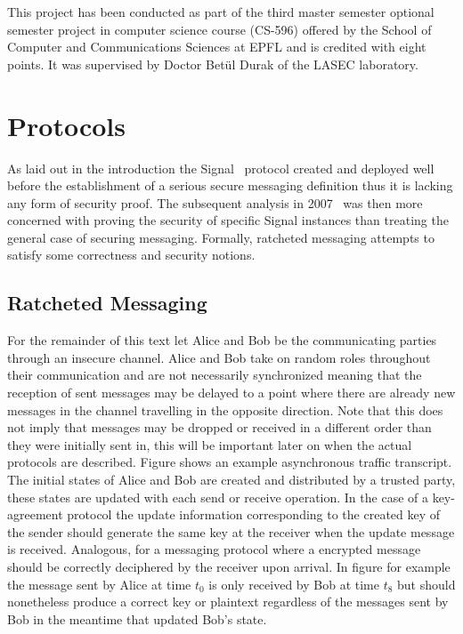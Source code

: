 \documentclass[11pt,a4paper,twoside,openright,bibliography=totoc]{scrbook}
\begin{document}
This project has been conducted as part of the third master semester optional
semester project in computer science course (CS-596) offered by the
School of Computer and Communications Sciences at EPFL and is credited
with eight points. It was supervised by Doctor Betül Durak of
the LASEC laboratory.

\chapter{Protocols}
\label{chap:protocols}

As laid out in the introduction the Signal~\cite{perrin2016double}
protocol created and deployed well before the establishment of a
serious secure messaging definition thus it is lacking any form of
security proof. The subsequent analysis in 2007~\cite{cohn2017formal}
was then more concerned with proving the security of specific Signal
instances than treating the general case of securing
messaging. Formally, ratcheted messaging attempts to satisfy some
correctness and security notions.


\section{Ratcheted Messaging}
\label{sec:ratcheted-messaging}

For the remainder of this text let Alice and Bob be the communicating
parties through an insecure channel. Alice and Bob take on random
roles throughout their communication and are not necessarily
synchronized meaning that the reception of sent messages may be
delayed to a point where there are already new messages in the channel
travelling in the opposite direction. Note that this does not imply
that messages may be dropped or received in a different order than
they were initially sent in, this will be important later on when
the actual protocols are described. Figure %
shows an example asynchronous traffic transcript. The initial states
of Alice and Bob are created and distributed by a trusted party, these
states are updated with each send or receive operation. In the case
of a key-agreement protocol the update information corresponding to
the created key of the sender should generate the same key at
the receiver when the update message is received. Analogous,
for a messaging protocol where a encrypted message should be
correctly deciphered by the receiver upon arrival. In figure
for example the message sent by Alice at time $t_0$ is only
received by Bob at time $t_8$ but should nonetheless produce
a correct key or plaintext regardless of the messages sent
by Bob in the meantime that updated Bob's state.
\end{document}

